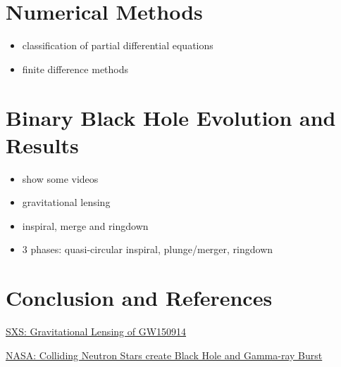 \documentclass[twocolumn]{article}
\begin{document}
  \section{Numerical Methods} %
  \label{sec:numerical_methods}
    \begin{itemize}
      \item classification of partial differential equations
      \item finite difference methods
    \end{itemize}

  \section{Binary Black Hole Evolution and Results} %
  \label{sec:binary_black_hole_evolution_and_results}
    \begin{itemize}
      \item show some videos
      \item gravitational lensing
      \item inspiral, merge and ringdown
    \end{itemize}

    \begin{itemize}
      \item 3 phases: quasi-circular inspiral, plunge/merger, ringdown
    \end{itemize}

  \section{Conclusion and References} %
  \label{sec:references}


  \href{run:videos/sxs-bbh-gravitational_lensing_of_gw150914.webm}{SXS: Gravitational Lensing of GW150914}

  \href{run:videos/nasa-colliding_neutron_stars_create_black_hole_and_gamma-ray_burst.webm}{NASA: Colliding Neutron Stars create Black Hole and Gamma-ray Burst}

  \nocite{*}
  
  

\end{document}
